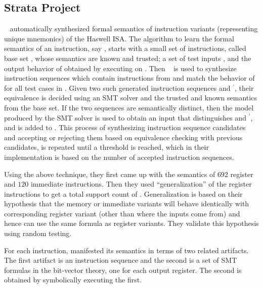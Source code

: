 \subsection{Strata Project}\label{sec:prelimstrata}
\Strata~\cite{Heule2016a} automatically synthesized formal semantics of \strataWithDupIS{} instruction variants (representing \strataIntel{} unique mnemonics) of the \ISA Haswell ISA. 
The algorithm to learn the formal semantics of an instruction, say , starts with a small set of instructions, called base set , whose semantics are known and trusted; a set of test inputs , and the output behavior of  obtained by executing  on . Then \Stoke~\cite{Stoke2013} is used  to synthesize  instruction sequences which contain instructions from  and match the behavior of  for all test cases in . Given two such generated instruction sequences  and $^\prime$, their equivalence is decided  using an SMT solver and the trusted and known  semantics from the base set. If the two sequences are
semantically distinct, then the model produced by the SMT solver is used  to obtain
an input  that distinguishes  and $^\prime$, and  is added to . This process of synthesizing instruction sequence candidates and accepting or rejecting them based on equivalence checking with previous candidates, is repeated until a threshold is reached, which in their implementation is based on the number of accepted instruction sequences. 

Using the above technique, they first came up with the semantics of $692$ register
and $120$ immediate instructions. Then they used ``generalization'' of the register
instructions to get a total support count of \strataWithDupIS. Generalization 
is based on their hypothesis that the memory or immediate variants will behave 
identically with corresponding register variant (other than where the inputs 
come from) and hence can use the same formula as register variants. They 
validate this hypothesis using random testing. 

For each instruction, \Strata manifested its semantics in terms of two related artifacts.
The first artifact is an instruction sequence and the second is a set of SMT formulas 
in the bit-vector theory, one for each output register. 
The second is obtained by symbolically executing the first.

